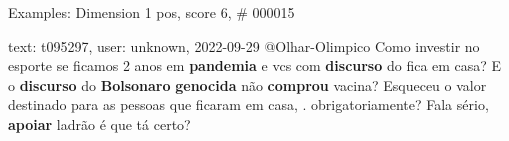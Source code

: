 \begin{frame}{Examples: Dimension 1 pos, score 6, \# 000015}
\footnotesize
\begin{exampleblock}{text: t095297, user: unknown, 2022-09-29}
@Olhar-Olimpico Como investir no esporte se ficamos 2 anos em \textbf{pandemia} 
e vcs com \textbf{discurso} do fica em casa? E o \textbf{discurso} do 
\textbf{Bolsonaro} \textbf{genocida} não \textbf{comprou} vacina? Esqueceu o 
valor destinado para as pessoas que ficaram em casa, . obrigatoriamente? Fala 
sério, \textbf{apoiar} ladrão é que tá certo? 
\end{exampleblock}
\end{frame}
